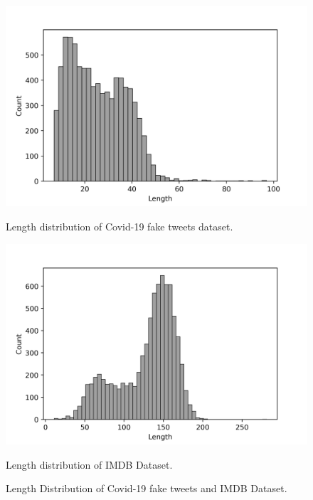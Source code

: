 \documentclass[%
	BCOR=8mm, %
	DIV=12,
	toc=bibliography, %
	toc=listof, %
	oneside, %
	egregdoesnotlikesansseriftitles, %
	]{scrbook}
\begin{document}
\begin{figure}[ht]
     \hspace*{3.0em}
    \begin{minipage}[b]{0.4\linewidth}
        \centering
        \includegraphics[width=\textwidth]{img/fakenewsLengthdist.png}
        \caption{Length distribution of Covid-19 fake tweets dataset.}
        \label{fig:fklendist}
    \end{minipage}
    \hspace{0.1cm}
    \begin{minipage}[b]{0.4\linewidth}
        \centering
        \includegraphics[width=\textwidth]{img/ImdbLengthdist.png}
        \caption{Length distribution of IMDB Dataset.}{}
        \label{fig:imdblendist}
    \end{minipage}
    \caption[Length distribution of Covid-19 fake tweets and IMDB Dataset]{\small Length Distribution of Covid-19 fake tweets and IMDB Dataset.}
    \label{fig:lendist}
\end{figure}
\end{document}

